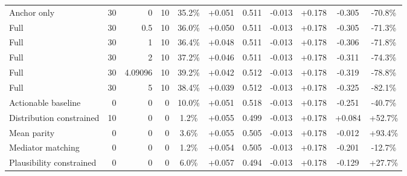\begin{table}[htbp]
\begin{tabular}{lrrrccccccc}
Anchor only & 30 & 0 & 10 & 35.2\% & +0.051 & 0.511 & -0.013 & +0.178 & -0.305 & -70.8\% \\
Full & 30 & 0.5 & 10 & 36.0\% & +0.050 & 0.511 & -0.013 & +0.178 & -0.305 & -71.3\% \\
Full & 30 & 1 & 10 & 36.4\% & +0.048 & 0.511 & -0.013 & +0.178 & -0.306 & -71.8\% \\
Full & 30 & 2 & 10 & 37.2\% & +0.046 & 0.511 & -0.013 & +0.178 & -0.311 & -74.3\% \\
Full & 30 & 4.09096 & 10 & 39.2\% & +0.042 & 0.512 & -0.013 & +0.178 & -0.319 & -78.8\% \\
Full & 30 & 5 & 10 & 38.4\% & +0.039 & 0.512 & -0.013 & +0.178 & -0.325 & -82.1\% \\
Actionable baseline & 0 & 0 & 0 & 10.0\% & +0.051 & 0.518 & -0.013 & +0.178 & -0.251 & -40.7\% \\
Distribution constrained & 10 & 0 & 0 & 1.2\% & +0.055 & 0.499 & -0.013 & +0.178 & +0.084 & +52.7\% \\
Mean parity & 0 & 0 & 0 & 3.6\% & +0.055 & 0.505 & -0.013 & +0.178 & -0.012 & +93.4\% \\
Mediator matching & 0 & 0 & 0 & 1.2\% & +0.054 & 0.505 & -0.013 & +0.178 & -0.201 & -12.7\% \\
Plausibility constrained & 0 & 0 & 0 & 6.0\% & +0.057 & 0.494 & -0.013 & +0.178 & -0.129 & +27.7\% \\
\bottomrule
\end{tabular}
\end{table}